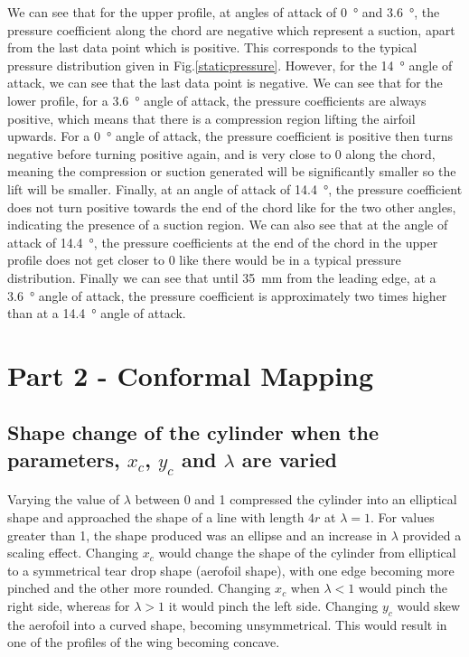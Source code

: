 \documentclass[11pt]{article}
\begin{document}
We can see that for the upper profile, at angles of attack of \SI{0}{\degree} and \SI{3.6}{\degree}, the pressure coefficient along the chord are negative which represent a suction, apart from the last data point which is positive. This corresponds to the typical pressure distribution given in Fig.\ref{staticpressure}. However, for the \SI{14}{\degree} angle of attack, we can see that the last data point is negative. We can see that for the lower profile, for a \SI{3.6}{\degree} angle of attack, the pressure coefficients are always positive, which means that there is a compression region lifting the airfoil upwards. For a \SI{0}{\degree} angle of attack, the pressure coefficient is positive then turns negative before turning positive again, and is very close to 0 along the chord, meaning the compression or suction generated will be significantly smaller so the lift will be smaller. Finally, at an angle of attack of \SI{14.4}{\degree}, the pressure coefficient does not turn positive towards the end of the chord like for the two other angles, indicating the presence of a suction region. We can also see that at the angle of attack of \SI{14.4}{\degree}, the pressure coefficients at the end of the chord in the upper profile does not get closer to 0 like there would be in a typical pressure distribution. Finally we can see that until \SI{35}{\milli\meter} from the leading edge, at a \SI{3.6}{\degree} angle of attack, the pressure coefficient is approximately two times higher than at a \SI{14.4}{\degree} angle of attack.
\section*{Part 2 - Conformal Mapping}
\subsection*{Shape change of the cylinder when the parameters, $x_c$, $y_c$ and $\lambda$ are varied}
Varying the value of $\lambda$ between 0 and 1 compressed the cylinder into an elliptical shape and approached the shape of a line with length $4r$ at $\lambda = 1$. For values greater than 1, the shape produced was an ellipse and an increase in $\lambda$ provided a scaling effect. Changing $x_c$ would change the shape of the cylinder from elliptical to a symmetrical tear drop shape (aerofoil shape), with one edge becoming more pinched and the other more rounded. Changing $x_c$ when $\lambda < 1$ would pinch the right side, whereas for $\lambda >1$ it would pinch the left side. Changing $y_c$ would skew the aerofoil into a curved shape, becoming unsymmetrical. This would result in one of the profiles of the wing becoming concave. 
\end{document}
